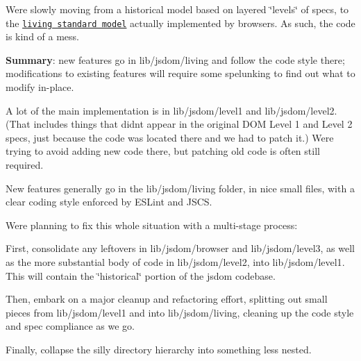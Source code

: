 We\textquotesingle{}re slowly moving from a historical model based on layered \char`\"{}levels\char`\"{} of specs, to the \href{https://wiki.whatwg.org/wiki/FAQ#What_does_.22Living_Standard.22_mean.3F}{\tt living standard model} actually implemented by browsers. As such, the code is kind of a mess.

{\bfseries Summary}\+: new features go in {\ttfamily lib/jsdom/living} and follow the code style there; modifications to existing features will require some spelunking to find out what to modify in-\/place. 



A lot of the main implementation is in {\ttfamily lib/jsdom/level1} and {\ttfamily lib/jsdom/level2}. (That includes things that didn\textquotesingle{}t appear in the original D\+OM Level 1 and Level 2 specs, just because the code was located there and we had to patch it.) We\textquotesingle{}re trying to avoid adding new code there, but patching old code is often still required.

New features generally go in the {\ttfamily lib/jsdom/living} folder, in nice small files, with a clear coding style enforced by E\+S\+Lint and J\+S\+CS.

We\textquotesingle{}re planning to fix this whole situation with a multi-\/stage process\+:


\begin{DoxyItemize}
\item First, consolidate any leftovers in {\ttfamily lib/jsdom/browser} and {\ttfamily lib/jsdom/level3}, as well as the more substantial body of code in {\ttfamily lib/jsdom/level2}, into {\ttfamily lib/jsdom/level1}. This will contain the \char`\"{}historical\char`\"{} portion of the jsdom codebase.
\item Then, embark on a major cleanup and refactoring effort, splitting out small pieces from {\ttfamily lib/jsdom/level1} and into {\ttfamily lib/jsdom/living}, cleaning up the code style and spec compliance as we go.
\item Finally, collapse the silly directory hierarchy into something less nested. 
\end{DoxyItemize}